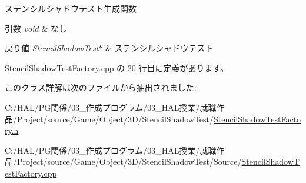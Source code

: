 ステンシルシャドウテスト生成関数 


\begin{DoxyParams}{引数}
{\em void} & なし \\
\hline
\end{DoxyParams}

\begin{DoxyRetVals}{戻り値}
{\em Stencil\+Shadow\+Test$\ast$} & ステンシルシャドウテスト \\
\hline
\end{DoxyRetVals}


 Stencil\+Shadow\+Test\+Factory.\+cpp の 20 行目に定義があります。



このクラス詳解は次のファイルから抽出されました\+:\begin{DoxyCompactItemize}
\item 
C\+:/\+H\+A\+L/\+P\+G関係/03\+\_\+作成プログラム/03\+\_\+\+H\+A\+L授業/就職作品/\+Project/source/\+Game/\+Object/3\+D/\+Stencil\+Shadow\+Test/\mbox{\hyperlink{_stencil_shadow_test_factory_8h}{Stencil\+Shadow\+Test\+Factory.\+h}}\item 
C\+:/\+H\+A\+L/\+P\+G関係/03\+\_\+作成プログラム/03\+\_\+\+H\+A\+L授業/就職作品/\+Project/source/\+Game/\+Object/3\+D/\+Stencil\+Shadow\+Test/\+Source/\mbox{\hyperlink{_stencil_shadow_test_factory_8cpp}{Stencil\+Shadow\+Test\+Factory.\+cpp}}\end{DoxyCompactItemize}
